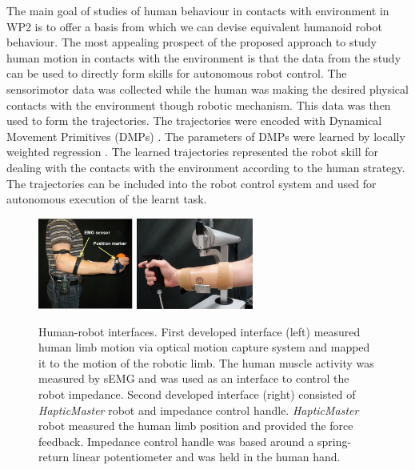 The main goal of studies of human behaviour in contacts with environment in WP2 is to offer a basis from which we can devise equivalent humanoid robot behaviour. The most appealing prospect of the proposed approach to study human motion in contacts with the environment is that the data from the study can be used to directly form skills for autonomous robot control. The sensorimotor data was collected while the human was making the desired physical contacts with the environment though robotic mechanism. This data was then used to form the trajectories. The trajectories were encoded with Dynamical Movement Primitives (DMPs) \cite{Ijspeert2002}. The parameters of DMPs were learned by locally weighted regression \cite{Schaal1998}. The learned trajectories represented the robot skill for dealing with the contacts with the environment according to the human strategy. The trajectories can be included into the robot control system and used for autonomous execution of the learnt task.
\begin{figure}[!t]
\centering
\includegraphics[height=3cm]{images/emg_setup.pdf}
\includegraphics[height=3cm]{images/haptic.pdf}
\caption{Human-robot interfaces. First developed interface (left) measured human limb motion via optical motion capture system and mapped it to the motion of the robotic limb. The human muscle activity was measured by sEMG and was used as an interface to control the robot impedance. Second developed interface (right) consisted of \textit{HapticMaster} robot and impedance control handle. \textit{HapticMaster} robot measured the human limb position and provided the force feedback. Impedance control handle was based around a spring-return linear potentiometer and was held in the human hand.}
\label{fig:interface}
\end{figure}

